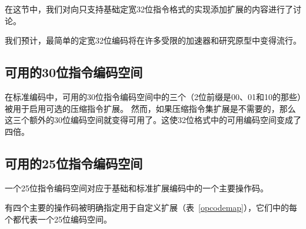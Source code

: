 在这节中，我们对向只支持基础定宽32位指令格式的实现添加扩展的内容进行了讨论。

\begin{commentary}
  我们预计，最简单的定宽32位编码将在许多受限的加速器和研究原型中变得流行。
\end{commentary}

\subsection*{可用的30位指令编码空间}

在标准编码中，可用的30位指令编码空间中的三个（2位前缀是00、01和10的那些）被用于启用可选的压缩指令扩展。
然而，如果压缩指令集扩展是不需要的，那么这三个额外的30位编码空间就变得可用了。这使32位格式中的可用编码空间变成了四倍。

\subsection*{可用的25位指令编码空间}

一个25位指令编码空间对应于基础和标准扩展编码中的一个主要操作码。

有四个主要的操作码被明确指定用于自定义扩展（表~\ref{opcodemap}），它们中的每个都代表一个25位编码空间。


